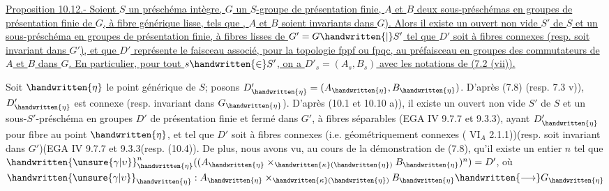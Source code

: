 \uline{Proposition 10.12.- Soient $S$ un préschéma intègre, $G$ un  $S$-groupe de présentation finie, $A$ et $B$ deux sous-préschémas en groupes de présentation finie de $G$, à fibre générique lisse, tels que ,  $A$ et $B$ soient invariants dans $G$). Alors il existe un ouvert non vide $S'$ de $S$ et un sous-préschéma en groupes de présentation finie, à fibres lisses  de $G'=G\handwritten{|}S'$\handwritten{,} tel que $D'$ soit  à fibres connexes (resp. soit invariant dans $G'$), et que $D'$ représente le faisceau associé, pour la topologie fppf ou fpqc, au préfaisceau en groupes des commutateurs de $A$ et $B$ dans $G$. En particulier, pour tout $s\handwritten{\in}S'$, on a $D'_s=(A_s,B_s)$ avec les notations de (7.2 (vii)).}

Soit $\handwritten{\eta}$ le point générique de $S$; posons $D'_{\handwritten{\eta}}=(A_{\handwritten{\eta}},B_{\handwritten{\eta}})$. D'après (7.8) (resp. 7.3 v)), $D'_{\handwritten{\eta}}$ est connexe (resp. invariant dans $G_{\handwritten{\eta}}$). D'après (10.1 et 10.10 a)), il existe un ouvert non vide $S'$ de $S$ et un sous-$S'$-préschéma en groupes $D'$ de présentation finie et fermé dans $G'$, à fibres séparables (EGA IV 9.7.7 et 9.3.3), ayant $D'_{\handwritten{\eta}}$ pour fibre au point $\handwritten{\eta}$, et tel que $D'$ soit à fibres connexes (i.e. géométriquement connexes ( $\mathrm{VI}_A$ 2.1.1))(resp. soit invariant dans $G'$)(EGA IV 9.7.7 et 9.3.3\inserted{\handwritten{)}}(resp. (10.4)). De plus, nous avons vu, au cours de la démonstration de (7.8), qu'il existe un entier $n$ tel que $\handwritten{\unsure{\gamma|\upsilon}}_{\handwritten{\eta}}^n((A_{\handwritten{\eta}}\times_{\handwritten{\kappa}(\handwritten{\eta})}B_{\handwritten{\eta}})^n)=D'$, où $\handwritten{\unsure{\gamma|\upsilon}}_{\handwritten{\eta}}:A_{\handwritten{\eta}}\times_{\handwritten{\kappa}(\handwritten{\eta})}B_{\handwritten{\eta}}\handwritten{\longrightarrow}G_{\handwritten{\eta}}$

